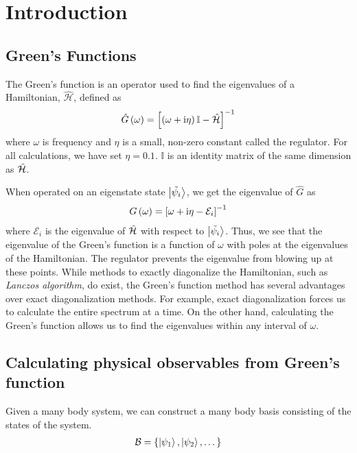 \chapter{\label{intro}Introduction}

\setcounter{equation}{0}
\setcounter{table}{0}
\setcounter{figure}{0}

\section{Green's Functions}
	The Green's function is an operator used to find the eigenvalues of a  Hamiltonian, $ \hat{\mathcal{H}} $, defined as \cite{coleman_2015}
	\begin{align}\label{eqn:gf-def}
		\hat{G}\left(\omega\right) = \left[ \left( \omega + \mathrm{i} \eta\right) \mathbb{I} - \hat{\mathcal{H}} \right]^{-1}
	\end{align}
	where $ \omega $ is frequency and $ \eta $ is a small, non-zero constant called the regulator. For all calculations, we have set $ \eta = 0.1 $. $ \mathbb{I} $ is an identity matrix of the same dimension as $ \hat{\mathcal{H}} $.
	
	When operated on an eigenstate state $ \ket{\tilde{\psi_i}} $, we get the eigenvalue of $ \hat{G} $ as
	\begin{align}
		G\left(\omega\right) = \left[ \omega + \mathrm{i} \eta - \mathcal{E}_i \right]^{-1}
	\end{align}
	where $ \mathcal{E}_i $ is the eigenvalue of $ \hat{\mathcal{H}} $ with respect to $ \ket{\tilde{\psi_i}} $. Thus, we see that the eigenvalue of the Green's function is a function of $ \omega $ with poles at the eigenvalues of the Hamiltonian. The regulator prevents the eigenvalue from blowing up at these points. While methods to exactly diagonalize the Hamiltonian, such as \textit{Lanczos algorithm}, do exist, the Green's function method has several advantages over exact diagonalization methods. For example, exact diagonalization forces us to calculate the entire spectrum at a time. On the other hand, calculating the Green's function allows us to find the eigenvalues within any interval of $\omega$.
    
\section{Calculating physical observables from Green's function}
	Given a many body system, we can construct a many body basis consisting of the states of the system.
	\begin{align}
		\mathcal{B} = \{ \ket{\psi_1}, \ket{\psi_2}, \dots \}
	\end{align} 
	
